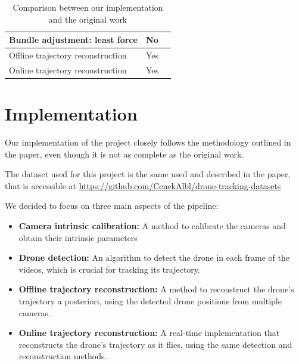 \documentclass[11pt]{article}
\begin{document}
\begin{table}[h]
\begin{tabularx}{\textwidth}{|Y|c|Y|}
        Bundle adjustment: least force                  & No                   &                                                                                                                    \\\hline
        Offline trajectory reconstruction               & Yes                  &                                                                                                                    \\\hline
        Online trajectory reconstruction                & Yes                  &                                                                                                                    \\\hline
    \end{tabularx}
    \caption{Comparison between our implementation and the original work}
    \label{tab:comparison}
\end{table}

\section{Implementation}

Our implementation of the project closely follows the methodology outlined in the paper, even though it is not as complete as the original work.

The dataset used for this project is the same used and described in the paper, that is accessible at \url{https://github.com/CenekAlbl/drone-tracking-datasets}

We decided to focus on three main aspects of the pipeline:

\begin{itemize}
    \item \textbf{Camera intrinsic calibration:} A method to calibrate the cameras and obtain their intrinsic parameters
    \item \textbf{Drone detection:} An algorithm to detect the drone in each frame of the videos, which is crucial for tracking its trajectory.
    \item \textbf{Offline trajectory reconstruction:} A method to reconstruct the drone's trajectory a posteriori, using the detected drone positions from multiple cameras.
    \item \textbf{Online trajectory reconstruction:} A real-time implementation that reconstructs the drone's trajectory as it flies, using the same detection and reconstruction methods.
\end{itemize}
\end{document}
